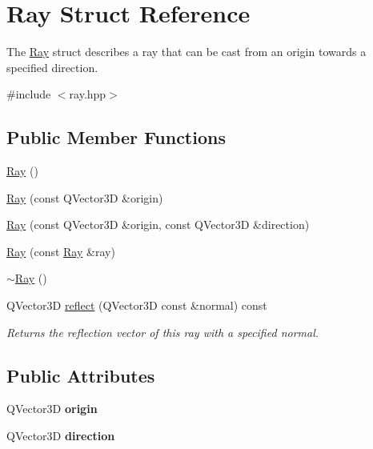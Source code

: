 \hypertarget{struct_ray}{}\section{Ray Struct Reference}
\label{struct_ray}


The \mbox{\hyperlink{struct_ray}{Ray}} struct describes a ray that can be cast from an origin towards a specified direction.  




{\ttfamily \#include $<$ray.\+hpp$>$}

\subsection*{Public Member Functions}
\begin{DoxyCompactItemize}
\item 
\mbox{\hyperlink{struct_ray_a2e3d2c29f2df4ab3da10da79d4acb852}{Ray}} ()
\item 
\mbox{\hyperlink{struct_ray_a92effebbda59de6b4f889718dec7520a}{Ray}} (const Q\+Vector3D \&origin)
\item 
\mbox{\hyperlink{struct_ray_a46a83135920eb622d6c51cc15091c6fc}{Ray}} (const Q\+Vector3D \&origin, const Q\+Vector3D \&direction)
\item 
\mbox{\hyperlink{struct_ray_a155a0b6573cf6a9a2256eb5062523daf}{Ray}} (const \mbox{\hyperlink{struct_ray}{Ray}} \&ray)
\item 
\mbox{\hyperlink{struct_ray_a8b0e575ce5df046c0c7615c32a96a46f}{$\sim$\+Ray}} ()
\item 
Q\+Vector3D \mbox{\hyperlink{struct_ray_aaa4b1d97ddd42e6a4a880b0854f0e84e}{reflect}} (Q\+Vector3D const \&normal) const
\begin{DoxyCompactList}\small\item\em Returns the reflection vector of this ray with a specified normal. \end{DoxyCompactList}\end{DoxyCompactItemize}
\subsection*{Public Attributes}
\begin{DoxyCompactItemize}
\item 
\mbox{\label{struct_ray_a8e3059d44fffe72fb98bb23528016a74}} 
Q\+Vector3D {\bfseries origin}
\item 
\mbox{\label{struct_ray_a4480e81172e55beea90f19542bb35fa4}} 
Q\+Vector3D {\bfseries direction}
\end{DoxyCompactItemize}
